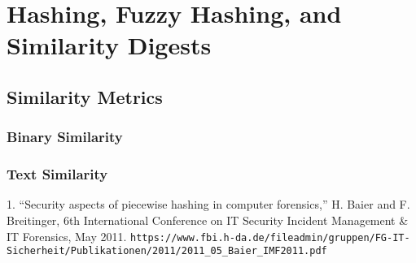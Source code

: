 \chapter{Hashing, Fuzzy Hashing, and Similarity Digests}

\section{Similarity Metrics}
\subsection{Binary Similarity}
\cite{dfrws2011:VassilRoussev}
\subsection{Text Similarity}
\cite{dfrws2011:ClayShieldsAndOphirFriederAndMarkMaloof}


1. “Security aspects of piecewise hashing in computer forensics,”
H. Baier and F. Breitinger, 6th International Conference on IT
Security Incident Management \& IT Forensics, May 2011. 
\verb+https://www.fbi.h-da.de/fileadmin/gruppen/FG-IT-Sicherheit/Publikationen/2011/2011_05_Baier_IMF2011.pdf+

